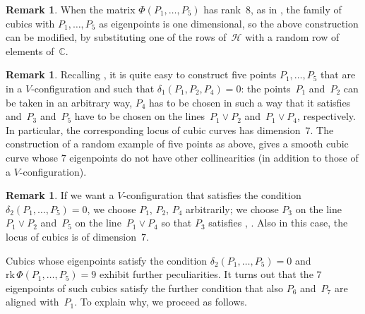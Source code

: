 \documentclass[a4paper, 11pt, reqno]{amsart}
\theoremstyle{plain}
\theoremstyle{definition}
\newtheorem{rmk}[lemma]{Remark}
\newcommand{\C}{\mathbb{C}}
\newcommand{\rk}{\ensuremath{\mathrm{rk}}}
\begin{document}
\begin{rmk}
When the matrix $\Phi(P_1, \dots, P_5)$ has rank~$8$, as in , the family of
cubics with $P_1, \dots, P_5$ as eigenpoints is one dimensional, so the
above construction can be modified, by substituting one of the rows of~$\mathcal{H}$ with a random row of elements of~$\C$.
\end{rmk}

\begin{rmk}
\label{rmk:construction_five_d1}
Recalling , it is quite easy to construct five points $P_1, \dots, P_5$ that are in a $V$-configuration
and such that $\delta_1(P_1, P_2, P_4)= 0$: the points~$P_1$
and~$P_2$ can be taken in an arbitrary way, $P_4$ has to be chosen in such
a way that it satisfies 
and~$P_3$ and~$P_5$ have to be chosen on the lines~$P_1 \vee P_2$ and~$P_1 \vee P_4$,
respectively. In particular, the corresponding locus of cubic curves
has dimension~$7$.
The construction of a random example
of five points as above, gives a smooth cubic curve whose $7$ eigenpoints
do not have other collinearities (in addition to those of a
$V$-configuration).
\end{rmk}

\begin{rmk}
\label{rmk:construction_five_d2}
If we want a $V$-configuration that satisfies the condition
$\delta_2(P_1, \dots, P_5) = 0$, we choose $P_1$, $P_2$, $P_4$ arbitrarily;
we choose $P_3$ on the line~$P_1 \vee P_2$ and~$P_5$ on the line~$P_1 \vee P_4$ so that $P_3$ satisfies , .
Also in this case, the locus of cubics is of dimension~$7$.
\end{rmk}

Cubics whose eigenpoints satisfy the condition $\delta_2(P_1, \dotsc, P_5) = 0$ and $\rk \, \Phi(P_1, \dotsc, P_5) = 9$ exhibit further peculiarities. It turns out that the $7$ eigenpoints of such cubics satisfy the further
condition that also $P_6$ and~$P_7$ are aligned with~$P_1$. To explain
why, we proceed as follows.
\end{document}
